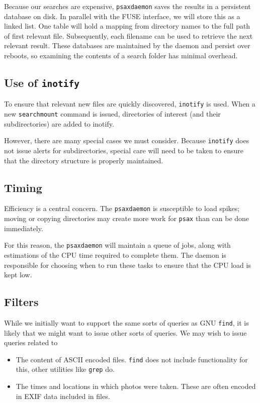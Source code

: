 \documentclass[a4paper]{report}
\newcommand{\inlinecode}{\texttt}
\begin{document}
Because our searches are expensive, \inlinecode{psaxdaemon} saves the results in a persistent database on disk. In parallel with the FUSE interface, we will store this as a linked list. One table will hold a mapping from directory names to the full path of first relevant file. Subsequently, each filename can be used to retrieve the next relevant result. These databases are maintained by the daemon and persist over reboots, so examining the contents of a search folder has minimal overhead.

\subsection{Use of \inlinecode{inotify}}

To ensure that relevant new files are quickly discovered, \inlinecode{inotify} is used. When a new \inlinecode{searchmount} command is issued, directories of interest (and their subdirectories) are added to inotify.

However, there are many special cases we must consider. Because \inlinecode{inotify} does not issue alerts for subdirectories, special care will need to be taken to ensure that the directory structure is properly maintained.

\subsection{Timing}

Efficiency is a central concern. The \inlinecode{psaxdaemon} is susceptible to load spikes; moving or copying directories may create more work for \inlinecode{psax} than can be done immediately.

For this reason, the \inlinecode{psaxdaemon} will maintain a queue of jobs, along with estimations of the CPU time required to complete them. The daemon is responsible for choosing when to run these tasks to ensure that the CPU load is kept low.

\subsection{Filters}

While we initially want to support the same sorts of queries as GNU \inlinecode{find}, it is likely that we might want to issue other sorts of queries. We may wish to issue queries related to
\begin{itemize}
\item The content of ASCII encoded files. \inlinecode{find} does not include functionality for this, other utilities like \inlinecode{grep} do.
\item The times and locations in which photos were taken. These are often encoded in EXIF data included in files.
\end{itemize}
\end{document}
